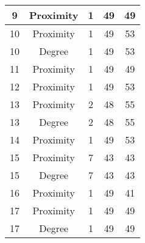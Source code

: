 \documentclass[results.tex]{subfiles}
\begin{document}
\begin{center}
\begin{tabular}{| c || c | c | c | c |}
            \hline
            9                       & Proximity                    & 1                      & 49                      & 49                   \\
            \hline
            10                      & Proximity                    & 1                      & 49                      & 53                   \\
            \hline
            10                      & Degree                       & 1                      & 49                      & 53                   \\
            \hline
            11                      & Proximity                    & 1                      & 49                      & 49                   \\
            \hline
            12                      & Proximity                    & 1                      & 49                      & 53                   \\
            \hline
            13                      & Proximity                    & 2                      & 48                      & 55                   \\
            \hline
            13                      & Degree                       & 2                      & 48                      & 55                   \\
            \hline
            14                      & Proximity                    & 1                      & 49                      & 53                   \\
            \hline
            15                      & Proximity                    & 7                      & 43                      & 43                   \\
            \hline
            15                      & Degree                       & 7                      & 43                      & 43                   \\
            \hline
            16                      & Proximity                    & 1                      & 49                      & 41                   \\
            \hline
            17                      & Proximity                    & 1                      & 49                      & 49                   \\
            \hline
            17                      & Degree                       & 1                      & 49                      & 49                   \\

\end{tabular}
\end{center}
\end{document}
